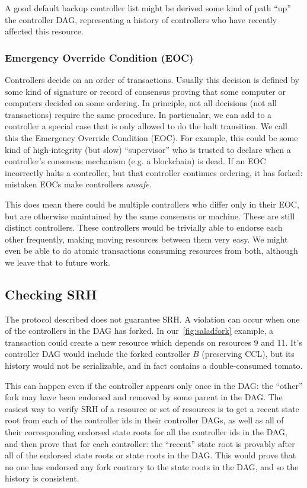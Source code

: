 \documentclass[a4paper,USenglish,cleveref, autoref, thm-restate, anonymous]{lipics-v2021}
\begin{document}
A good default backup controller list might be derived some kind of path ``up'' the controller DAG, representing a history of controllers who have recently affected this resource. 

\subsubsection{Emergency Override Condition (EOC)}
Controllers decide on an order of transactions.
Usually this decision is defined by some kind of signature or record of consensus proving that some computer or computers decided on some ordering.
In principle, not all decisions (not all transactions) require the same procedure.
In particualar, we can add to a controller a special case that is only allowed to do the halt transition.
We call this the Emergency Override Condition (EOC). 
For example, this could be some kind of high-integrity (but slow) ``supervisor'' who is trusted to declare when a controller's consensus mechanism (e.g. a blockchain) is dead.
If an EOC incorrectly halts a controller, but that controller continues ordering, it has forked: mistaken EOCs make controllers \emph{unsafe}. 

This does mean there could be multiple controllers who differ only in their EOC, but are otherwise maintained by the same consensus or machine.
These are still distinct controllers.
These controllers would be trivially able to endorse each other frequently, making moving resources between them very easy. 
We might even be able to do atomic transactions consuming resources from both, although we leave that to future work. 



\subsection{Checking SRH}
The protocol described does not guarantee SRH.
A violation can occur when one of the controllers in the DAG has forked.
In our~\cref{fig:saladfork} example, a transaction could create a new resource which depends on resources 9 and 11.
It's controller DAG would include the forked controller $B$ (preserving CCL), but its history would not be serializable, and in fact contains a double-consumed tomato.

This can happen even if the controller appears only once in the DAG: the ``other'' fork may have been endorsed and removed by some parent in the DAG.
The easiest way to verify SRH of a resource or set of resources is to get a recent state root from each of the controller ids in their controller DAGs, as well as all of their corresponding endorsed state roots for all the controller ids in the DAG, and then prove that for each controller: the ``recent'' state root is provably after all of the endorsed state roots or state roots in the DAG.
This would prove that no one has endorsed any fork contrary to the state roots in the DAG, and so the history is consistent. 
\end{document}
